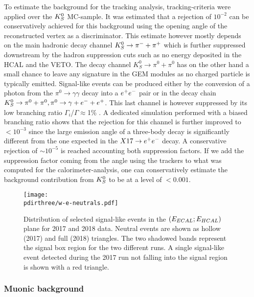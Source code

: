 To estimate the background for the tracking analysis, tracking-criteria were applied over the $K^0_S$ MC-sample. It was estimated that a rejection of $10^{-2}$ can be conservatively achieved for this background using the opening angle of the reconstructed vertex as a discriminator. This estimate however mostly depends on the main hadronic decay channel $K^0_S \rightarrow \pi^- + \pi^+$ which is further suppressed downstream by the hadron suppression cuts such as no energy deposited in the HCAL and the VETO. The decay channel $K^0_S \rightarrow \pi^0 + \pi^0$ has on the other hand a small chance to leave any signature in the GEM modules as no charged particle is typically emitted. Signal-like events can be produced either by the conversion of a photon from the $\pi^0 \rightarrow \gamma \gamma$ decay into a $e^+e^-$ pair or in the decay chain $K^0_S \rightarrow \pi^0 + \pi^0, \pi^0 \rightarrow \gamma + e^- + e^+$. This last channel is however suppressed by its low branching ratio $\Gamma_i$/$\Gamma \approx $1\% \cite{review-particle-physics}. A dedicated simulation performed with a biased branching ratio shows that the rejection for this channel is further improved to $< 10^{-3}$ since the large emission angle of a three-body decay is significantly different from the one expected in the $X17 \rightarrow e^+ e^-$ decay. A conservative rejection of $\sim 10^{-5}$ is reached accounting both suppression factors. If we add the suppression factor coming from the angle using the trackers to what was computed for the calorimeter-analysis, one can conservatively estimate the background contribution from $K^0_S$ to be at a level of $<0.001$.


\begin{figure}[bth!]
  \centering
  \texttt{[image: \\pdirthree/w-e-neutrals.pdf]}
  \caption[neutral events in visible mode]{Distribution of selected signal-like events in the $(E_{ECAL};E_{HCAL})$ plane for 2017 and 2018 data. Neutral events are shown as hollow (2017) and full (2018) triangles. The two shadowed bands represent the signal box region for the two different runs. A single signal-like event detected during the 2017 run not falling into the signal region is shown with a red triangle.}
  \label{fig:w-e-vis}
\end{figure}

\subsubsection{Muonic background}
\label{ch3:sec:bkg:vis:muon}

